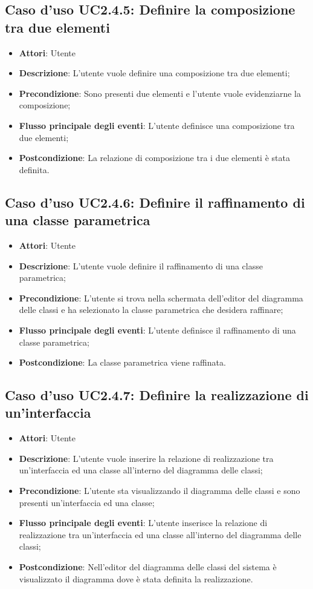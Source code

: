 \documentclass[../AnalisiDeiRequisiti.tex]{subfiles}
\begin{document}
		\subsection{Caso d'uso UC2.4.5: Definire la composizione tra due elementi}
		\begin{itemize}
			\item \textbf{Attori}: Utente
			\item \textbf{Descrizione}: L'utente vuole definire una composizione tra due elementi;
			\item \textbf{Precondizione}: Sono presenti due elementi e l'utente vuole evidenziarne la composizione;
			\item \textbf{Flusso principale degli eventi}: L'utente definisce una composizione tra due elementi;
			\item \textbf{Postcondizione}: La relazione di composizione tra i due elementi è stata definita.
		\end{itemize}
		\subsection{Caso d'uso UC2.4.6: Definire il raffinamento di una classe parametrica}
		\begin{itemize}
			\item \textbf{Attori}: Utente
			\item \textbf{Descrizione}: L'utente vuole definire il raffinamento di una classe parametrica;
			\item \textbf{Precondizione}: L'utente si trova nella schermata dell'editor del diagramma delle classi e ha selezionato la classe parametrica che desidera raffinare;
			\item \textbf{Flusso principale degli eventi}: L'utente definisce il raffinamento di una classe parametrica;
			\item \textbf{Postcondizione}: La classe parametrica viene raffinata.
		\end{itemize}
		\subsection{Caso d'uso UC2.4.7: Definire la realizzazione di un'interfaccia}
		\begin{itemize}
			\item \textbf{Attori}: Utente
			\item \textbf{Descrizione}: L'utente vuole inserire la relazione di realizzazione tra  un'interfaccia ed una classe all'interno del diagramma delle classi;
			\item \textbf{Precondizione}: L'utente sta visualizzando il diagramma delle classi e sono presenti un'interfaccia ed una classe;
			\item \textbf{Flusso principale degli eventi}: L'utente inserisce la relazione di realizzazione tra un'interfaccia ed una classe all'interno del diagramma delle classi;
			\item \textbf{Postcondizione}: Nell'editor del diagramma delle classi del sistema è visualizzato il diagramma dove è stata definita la realizzazione.
		\end{itemize}
\end{document}
